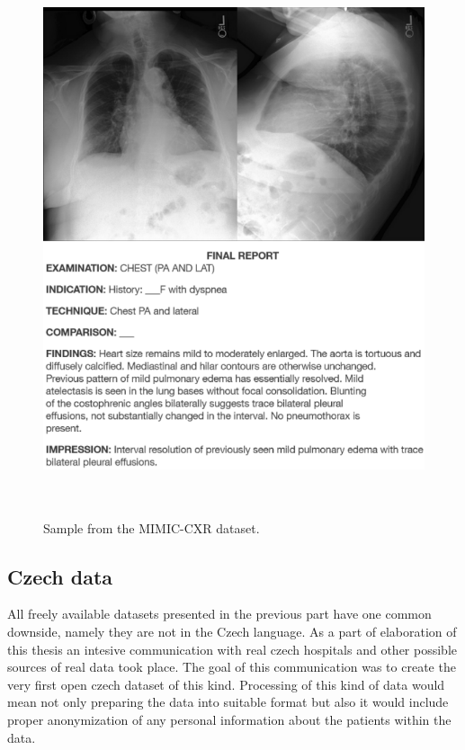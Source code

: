 \begin{figure}[h]\centering
\includegraphics[width=135mm, height=163mm]{../img/mimic_s57861150}
\caption{Sample from the MIMIC-CXR dataset.}
\label{fig02:MimicCXRSample}
\end{figure}

\newpage

\subsection{Czech data}
\label{sec:CzechData}
All freely available datasets presented in the previous part have one common downside, namely they are not in the Czech language. As a part of elaboration of this thesis an intesive communication with real czech hospitals and other possible sources of real data took place. The goal of this communication was to create the very first open czech dataset of this kind. Processing of this kind of data would mean not only preparing the data into suitable format but also it would include proper anonymization of any personal information about the patients within the data. \\

